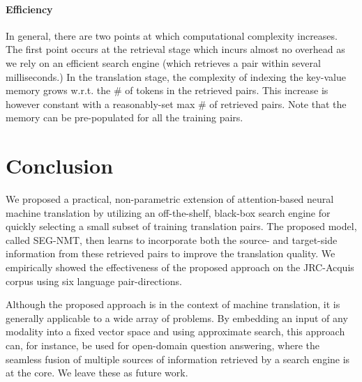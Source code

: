 \vspace{-7pt}
\paragraph{Efficiency}
In general, there are two points at which computational complexity increases. The first point occurs at the retrieval stage which incurs almost no overhead as we rely on an efficient search engine (which retrieves a pair within several milliseconds.) In the translation stage, the complexity of indexing the key-value memory grows w.r.t. the \# of tokens in the retrieved pairs. This increase is however constant with a reasonably-set max \# of retrieved pairs. Note that the memory can be pre-populated for all the training pairs.



\section{Conclusion}

We proposed a practical, non-parametric extension of attention-based neural machine translation by utilizing an off-the-shelf, black-box search engine for quickly selecting a small subset of training translation pairs. The proposed model, called SEG-NMT, then learns to incorporate both the source- and target-side information from these retrieved pairs to improve the translation quality. We empirically showed the effectiveness of the proposed approach on the JRC-Acquis corpus using six language pair-directions. 

Although the proposed approach is in the context of machine translation, it is generally applicable to a wide array of problems. By embedding an input of any modality into a fixed vector space and using approximate search\citep{FAISS}, this approach can, for instance, be used for open-domain question answering, where the seamless fusion of multiple sources of information retrieved by a search engine is at the core. We leave these as future work.

